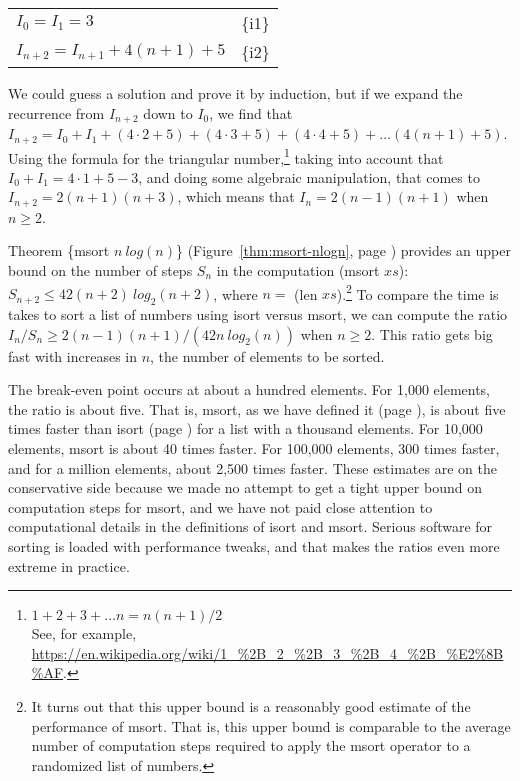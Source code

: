 \begin{center}
\begin{tabular}{ll}
$I_0 = I_1 = 3$              & \{i1\} \\
$I_{n+2} = I_{n+1} + 4(n+1) + 5$ & \{i2\} \\
\end{tabular}
\end{center}

We could guess a solution and prove it by induction,
but if we expand the recurrence from $I_{n+2}$ down to $I_0$,
we find that
$I_{n+2} = I_0 + I_1 + (4\cdot 2 + 5) + (4\cdot 3 + 5) + (4\cdot 4 + 5) + \dots (4(n+1) + 5)$.
Using the formula for the triangular number,\footnote{$1 + 2 + 3 + \dots n = n(n+1)/2$ \\
See, for example, \url{https://en.wikipedia.org/wiki/1_\%2B_2_\%2B_3_\%2B_4_\%2B_\%E2\%8B\%AF}.}
taking into account that $I_0 + I_1 = 4\cdot 1+5-3$, and doing some algebraic manipulation,
that comes to $I_{n+2} = 2(n+1)(n+3)$, which means that 
$I_{n} = 2(n-1)(n+1)$ when $n \geq 2$.

Theorem \{msort $n~log(n)$\}
(Figure~\ref{thm:msort-nlogn}, page \pageref{thm:msort-nlogn}) provides
an upper bound on the number of steps $S_n$ in the computation (msort $xs$):
$S_{n+2} \leq 42(n+2)~log_2(n+2)$, where $n =$ (len $xs$).\footnote{It
turns out that this upper bound is a reasonably good estimate
of the performance of msort.
That is, this upper bound is comparable to the average number
of computation steps required to apply the msort operator
to a randomized list of numbers.}
To compare the time is takes to sort a list of numbers using isort versus msort,
we can compute the ratio $I_n/S_n \geq 2(n-1)(n+1)/(42n~log_2(n))$ when $n \geq 2$.
This ratio gets big fast with increases in $n$, the number of elements to be sorted.

The break-even point occurs at about a hundred elements.
For 1,000 elements, the ratio is about five.
That is, msort, as we have defined it (page \pageref{defun:msort-copy}),
is about five times faster
than isort (page \pageref{defun:insert-isort-copy})
for a list with a thousand elements.
For 10,000 elements, msort is about 40 times faster.
For 100,000 elements, 300 times faster,
and for a million elements, about 2,500 times faster.
These estimates are on the conservative side
because we made no attempt to get a tight
upper bound on computation steps for msort,
and we have not paid close attention to computational details
in the definitions of isort and  msort.
Serious software for sorting is loaded with performance tweaks,
and that makes the ratios even more extreme in practice.


